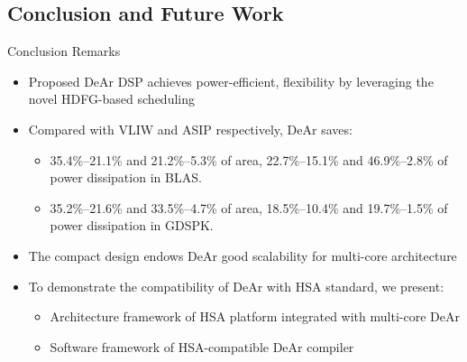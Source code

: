 \documentclass{beamer}
\begin{document}
\begin{CJK}{UTF8}{bkai}
            \section{Conclusion and Future Work}
            \begin{frame}{Conclusion Remarks}
                \begin{itemize}
                    \item <2->{Proposed DeAr DSP achieves power-efficient, flexibility by leveraging the novel HDFG-based scheduling}
                    \item <3->{Compared with VLIW and ASIP respectively, DeAr saves:
                            \begin{itemize}
                                \item 35.4\%--21.1\% and 21.2\%--5.3\% of area, 22.7\%--15.1\% and 46.9\%--2.8\% of power dissipation in BLAS.
                                \item 35.2\%--21.6\% and 33.5\%--4.7\% of area, 18.5\%--10.4\% and 19.7\%--1.5\% of power dissipation in GDSPK.
                            \end{itemize}
                        }
                    \item <4->{The compact design endows DeAr good scalability for multi-core architecture}
                    \item <5->{To demonstrate the compatibility of DeAr with HSA standard, we present:
                            \begin{itemize}
                                \item Architecture framework of HSA platform integrated with multi-core DeAr
                                \item Software framework of HSA-compatible DeAr compiler
                            \end{itemize}
                        }
                \end{itemize}
            \end{frame}


\end{CJK}
\end{document}
